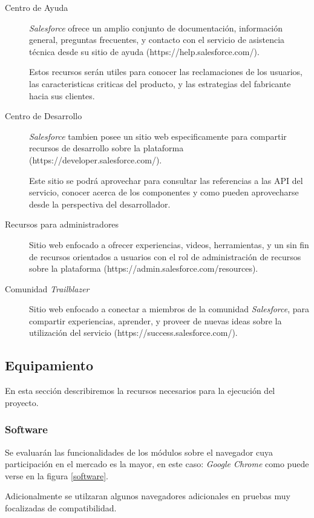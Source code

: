 \begin{description}
\item [Centro de Ayuda] \emph{Salesforce} ofrece un amplio conjunto de
documentación, información general, preguntas frecuentes, y contacto con el
servicio de asistencia técnica desde su sitio de ayuda
(https://help.salesforce.com/).

Estos recursos serán utiles para conocer las reclamaciones de los usuarios, las
caracteristicas criticas del producto, y las estrategias del fabricante hacia
sus clientes.

\item [Centro de Desarrollo] \emph{Salesforce} tambien posee un sitio web
especificamente para compartir recursos de desarrollo sobre la plataforma
(https://developer.salesforce.com/).

Este sitio se podrá aprovechar para consultar las referencias a las API del
servicio, conocer acerca de los componentes y como pueden aprovecharse desde la
perspectiva del desarrollador.

\item [Recursos para administradores] Sitio web enfocado a ofrecer experiencias,
videos, herramientas, y un sin fin de recursos orientados a usuarios con el rol
de administración de recursos sobre la plataforma
(https://admin.salesforce.com/resources).

\item [Comunidad \emph{Trailblazer}] Sitio web enfocado a conectar a miembros de
la comunidad \emph{Salesforce}, para compartir experiencias, aprender, y proveer
de nuevas ideas sobre la utilización del servicio
(https://success.salesforce.com/).

\end{description}

\subsection{Equipamiento}
En esta sección describiremos la recursos necesarios para la ejecución del
proyecto.

\subsubsection{Software}
Se evaluarán las funcionalidades de los módulos sobre el navegador cuya
participación en el mercado es la mayor, en este caso: \emph{Google Chrome}
como puede verse en la figura \ref{software}.

Adicionalmente se utilzaran algunos navegadores adicionales en pruebas muy
focalizadas de compatibilidad.

